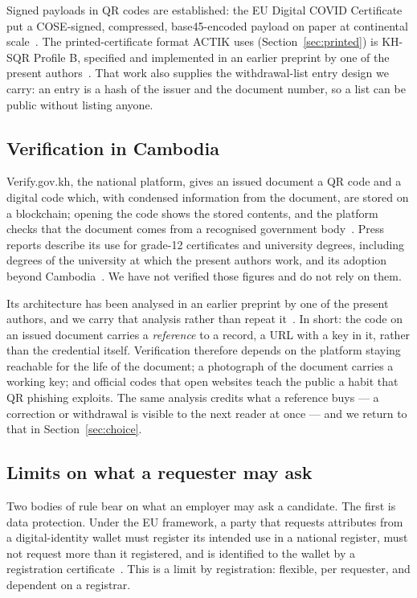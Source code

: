 \documentclass[10pt,a4paper,twocolumn]{article}
\begin{document}
Signed payloads in QR codes are established: the EU Digital COVID Certificate put
a COSE-signed, compressed, base45-encoded payload on paper at continental
scale~\citep{eudcc2021,rfc9052}. The printed-certificate format ACTIK uses
(Section~\ref{sec:printed}) is KH-SQR Profile B, specified and implemented in an
earlier preprint by one of the present authors~\citep{chay2026qrseal,khsqr2026repo}.
That work also supplies the withdrawal-list entry design we carry: an entry is a
hash of the issuer and the document number, so a list can be public without
listing anyone.

\subsection{Verification in Cambodia}

Verify.gov.kh, the national platform, gives an issued document a QR code and a
digital code which, with condensed information from the document, are stored on a
blockchain; opening the code shows the stored contents, and the platform checks
that the document comes from a recognised government body~\citep{verifygovkh}.
Press reports describe its use for grade-12 certificates and university degrees,
including degrees of the university at which the present authors work, and its
adoption beyond Cambodia~\citep{khmertimes2026verifygov,cambodianess2026verifygov}.
We have not verified those figures and do not rely on them.

Its architecture has been analysed in an earlier preprint by one of the present
authors, and we carry that analysis rather than repeat it~\citep{chay2026qrseal}.
In short: the code on an issued document carries a \emph{reference} to a record,
a URL with a key in it, rather than the credential itself. Verification therefore
depends on the platform staying reachable for the life of the document; a
photograph of the document carries a working key; and official codes that open
websites teach the public a habit that QR phishing exploits. The same analysis
credits what a reference buys --- a correction or withdrawal is visible to the
next reader at once --- and we return to that in Section~\ref{sec:choice}.

\subsection{Limits on what a requester may ask}
\label{sec:known-hiring}

Two bodies of rule bear on what an employer may ask a candidate. The first is
data protection. Under the EU framework, a party that requests attributes from a
digital-identity wallet must register its intended use in a national register,
must not request more than it registered, and is identified to the wallet by a
registration certificate~\citep{eidas2,eu2025848}. This is a limit by
registration: flexible, per requester, and dependent on a registrar.
\end{document}
